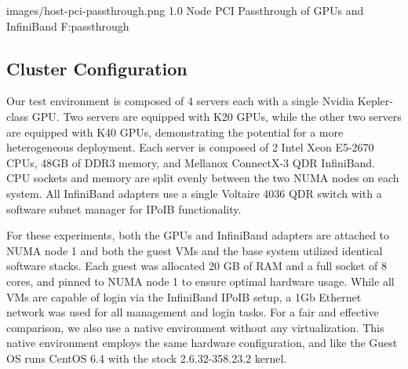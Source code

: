 \documentclass[10pt]{sigplanconf}
\begin{document}
  {images/host-pci-passthrough.png}
  {1.0}
  {Node PCI Passthrough of GPUs and InfiniBand}
  {F:passthrough}




\subsection{Cluster Configuration}

Our test environment is composed of 4 servers each with a single Nvidia
Kepler-class GPU.  Two servers are equipped with K20 GPUs, while the other two
servers are equipped with K40 GPUs, demonstrating the potential for a more
heterogeneous deployment.  Each server is composed of 2 Intel Xeon E5-2670 CPUs,
48GB of DDR3 memory, and Mellanox ConnectX-3 QDR InfiniBand.  CPU sockets and
memory are split evenly between the two NUMA nodes on each system. All
InfiniBand adapters use a single Voltaire 4036 QDR switch with a software subnet
manager for IPoIB functionality.   


For these experiments, both the GPUs and InfiniBand adapters are attached to NUMA node 1 and both the guest VMs and the base system utilized identical software stacks.  Each guest was allocated 20 GB of RAM and a full socket of 8 cores, and pinned to NUMA node 1 to ensure optimal hardware usage. While all VMs are capable of login via the InfiniBand IPoIB setup, a 1Gb Ethernet network was used for all management and login tasks.  
For a fair and effective comparison, we also use a native environment without any virtualization. This native environment employs the same hardware configuration, and like the Guest OS runs CentOS 6.4 with the stock 2.6.32-358.23.2 kernel. 
\end{document}
